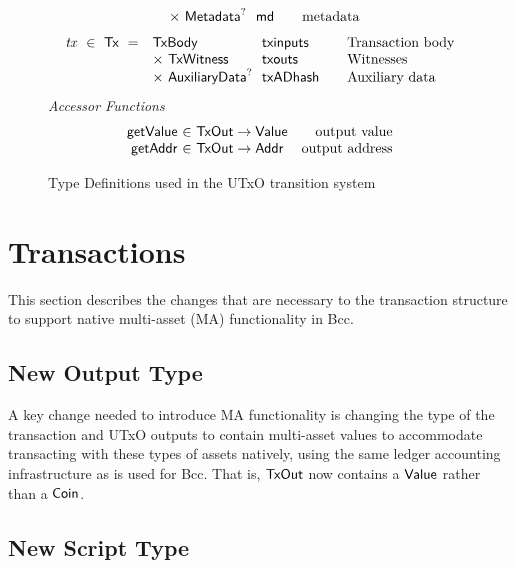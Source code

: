 \begin{figure*}[t!]
\begin{equation*}
\begin{array}{r@{~~}l@{~~}l@{\qquad}l}
      & \times ~\Metadata^? & \fun{md} & \text{metadata}
    \end{array}
  \end{equation*}
  \begin{equation*}
    \begin{array}{r@{~~}l@{~~}l@{\qquad}l}
      \var{tx} ~\in~ \Tx ~=~
      & \TxBody & \fun{txinputs}& \text{Transaction body}\\
      &\times ~\TxWitness & \fun{txouts}& \text{Witnesses}\\
      & \times ~\AuxiliaryData^? & \fun{txADhash} & \text{Auxiliary data}
    \end{array}
  \end{equation*}
  \emph{Accessor Functions}
  \begin{equation*}
    \begin{array}{r@{~\in~}lr}
      \fun{getValue} & \TxOut \to \Value & \text{output value} \\
      \fun{getAddr} & \TxOut \to \Addr & \text{output address}
    \end{array}
  \end{equation*}
  \caption{Type Definitions used in the UTxO transition system}
  \label{fig:defs:utxo-sophie}
\end{figure*}

\section{Transactions}
\label{sec:transactions}

This section describes the changes that are necessary to the
transaction structure to support native multi-asset (MA) functionality in
Bcc.

\subsection*{New Output Type}

A key change needed to introduce MA functionality is changing the type of
the transaction and UTxO outputs to contain multi-asset values to accommodate
transacting with these types of assets natively, using the same ledger accounting
infrastructure as is used for Bcc. That is,
$\mathsf{TxOut}$ now contains a $\mathsf{Value}$ rather than a $\mathsf{Coin}$.

\subsection*{New Script Type}

